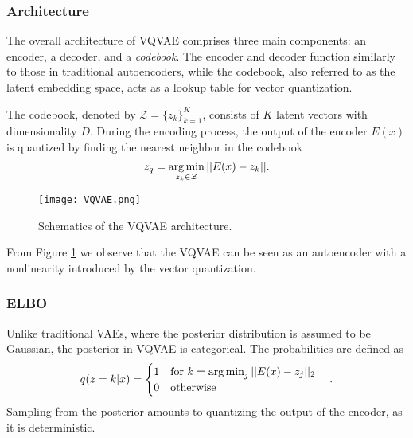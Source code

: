 \documentclass[../../thesis.tex]{subfiles}
\begin{document}


\subsubsection{Architecture}

The overall architecture of VQVAE comprises three main components: an encoder, a decoder, and a \textit{codebook}. The encoder and decoder function similarly to those in traditional autoencoders, while the codebook, also referred to as the latent embedding space, acts as a lookup table for vector quantization.\newline

The codebook, denoted by $\mathcal{Z} = \{z_k\}_{k=1}^K$, consists of $K$ latent vectors with dimensionality $D$. During the encoding process, the output of the encoder $E(x)$ is quantized by finding the nearest neighbor in the codebook
\begin{equation}
    z_q = \operatorname*{arg\,min}_{z_k\in\mathcal{Z}} ||E(x)-z_k||.
\end{equation}
\begin{figure}[h]
    \texttt{[image: VQVAE.png]}
    \centering
    \caption{Schematics of the VQVAE architecture.}
    \label{fig:VQVAE}
\end{figure}
From Figure \ref{fig:VQVAE} we observe that the VQVAE can be seen as an autoencoder with a nonlinearity introduced by the vector quantization.

\subsubsection{ELBO}
Unlike traditional VAEs, where the posterior distribution is assumed to be Gaussian, the posterior in VQVAE is categorical. The probabilities are defined as
\begin{equation}
    q(z=k | x) = 
    \begin{cases} 
        1 \quad \text{for }k = \operatorname*{arg\,min}_j||E(x) - z_j||_2 \\
        0 \quad \text{otherwise}
    \end{cases}.
\end{equation}
Sampling from the posterior amounts to quantizing the output of the encoder, as it is deterministic. \newline
\end{document}
